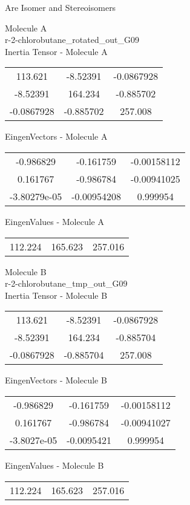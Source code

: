 \begin{center}
\vtab
\vtab
\textcolor{NavyBlue}{\Large Are Isomer and Stereoisomers}
\end{center}
\newpage
\begin{multicols}{2}
\begin{center}
Molecule A \\ 
r-2-chlorobutane\_rotated\_out\_G09
\\
Inertia Tensor - Molecule A \\
\vtab
\begin{tabular}{|c c c|}
113.621	 & 	-8.52391	 & 	-0.0867928	 \\
-8.52391	 & 	164.234	 & 	-0.885702	 \\
-0.0867928	 & 	-0.885702	 & 	257.008
\end{tabular}

\vtab
 EingenVectors - Molecule A     \\
\vtab
\begin{tabular}{|c c c|}
-0.986829	 & 	-0.161759	 & 	-0.00158112	 \\
0.161767	 & 	-0.986784	 & 	-0.00941025	 \\
-3.80279e-05	 & 	-0.00954208	 & 	0.999954
\end{tabular}

\vtab
 EingenValues - Molecule A     \\
\vtab
\begin{tabular}{|c c c|}
112.224	 & 	165.623	 & 	257.016
\end{tabular}
\columnbreak

Molecule B \\ 
r-2-chlorobutane\_tmp\_out\_G09
\\
Inertia Tensor - Molecule B \\
\vtab
\begin{tabular}{|c c c|}
113.621	 & 	-8.52391	 & 	-0.0867928	 \\
-8.52391	 & 	164.234	 & 	-0.885704	 \\
-0.0867928	 & 	-0.885704	 & 	257.008
\end{tabular}

\vtab
 EingenVectors - Molecule B     \\
\vtab
\begin{tabular}{|c c c|}
-0.986829	 & 	-0.161759	 & 	-0.00158112	 \\
0.161767	 & 	-0.986784	 & 	-0.00941027	 \\
-3.8027e-05	 & 	-0.0095421	 & 	0.999954
\end{tabular}

\vtab
 EingenValues - Molecule B     \\
\vtab
\begin{tabular}{|c c c|}
112.224	 & 	165.623	 & 	257.016
\end{tabular}

\end{center}
\end{multicols}
